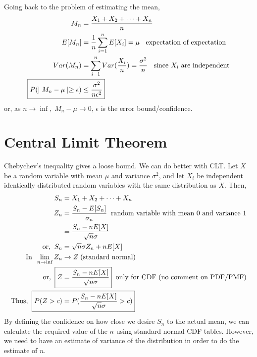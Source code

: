 \documentclass[11pt, a4paper]{article}
\begin{document}
    Going back to the problem of estimating the mean,
    \begin{align*}
        M_{n} &= \frac{X_{1} + X_{2} + \cdots + X_{n}}{n} \\
        E[M_{n}] &= \frac{1}{n} \sum_{i=1}^{n} E[X_{i}] = \mu \text{\;\; expectation of expectation} \\
        Var(M_{n}) &= \sum_{i=1}^{n} Var(\frac{X_{i}}{n}) = \frac{\sigma^{2}}{n} \text{\;\; since $X_{i}$ are independent} \\
        \Aboxed{P(\mid M_{n} - \mu \mid \geq \epsilon) &\leq \frac{\sigma^{2}}{n\epsilon^{2}}}
    \end{align*}
    or, as $n \rightarrow \inf,\; M_{n} - \mu \rightarrow 0$, $\epsilon$ is the error bound/confidence.

    \section{Central Limit Theorem}
    Chebychev's inequality gives a loose bound. We can do better with CLT. Let $X$ be a random variable with mean $\mu$ and variance $\sigma^{2}$, and let $X_{i}$ be independent identically distributed random variables with the same distribution as $X$. Then,
    \begin{align*}
        S_{n} &= X_{1} + X_{2} + \cdots + X_{n}\\
        Z_{n} &= \frac{S_{n} - E[S_{n}]}{\sigma_{n}} \text{\;\;random variable with mean $0$ and variance $1$} \\
             &= \frac{S_{n} - nE[X]}{\sqrt{n} \sigma}\\
        \text{or,\;\;} S_{n} &= \sqrt{n} \sigma Z_{n} + nE[X] \\
        \text{In\;\;} \lim_{n \to \inf} Z_{n} &\rightarrow Z \text{\;(standard normal)}\\
        \text{or,\;\;} \Aboxed{Z &= \frac{S_{n} - nE[X]}{\sqrt{n} \sigma}} \text{\;\;only for CDF (no comment on PDF/PMF)}\\
        \text{Thus,\;\;} \Aboxed{P(Z > c) &= P(\frac{S_{n} - nE[X]}{\sqrt{n} \sigma} > c)}
    \end{align*}
    By defining the confidence on how close we desire $S_{n}$ to the actual mean, we can calculate the required value of the $n$ using standard normal CDF tables. However, we need to have an estimate of variance of the distribution in order to do the estimate of $n$.
\end{document}
